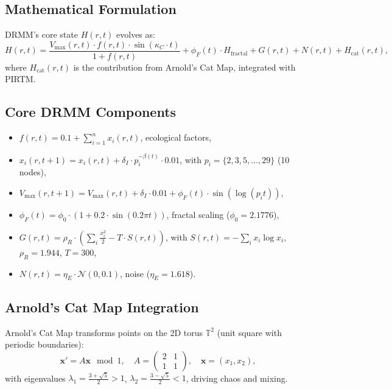 \documentclass{article}
\theoremstyle{plain}
\begin{document}
\subsection{Mathematical Formulation}
DRMM’s core state \( H(r,t) \) evolves as:
\begin{equation}
H(r,t) = \frac{V_{\text{max}}(r,t) \cdot f(r,t) \cdot \sin(\kappa_C \cdot t)}{1 + f(r,t)} + \phi_F(t) \cdot H_{\text{fractal}} + G(r,t) + N(r,t) + H_{\text{cat}}(r,t),
\end{equation}
where \( H_{\text{cat}}(r,t) \) is the contribution from Arnold’s Cat Map, integrated with PIRTM.

\subsection{Core DRMM Components}
\begin{itemize}
    \item \( f(r,t) = 0.1 + \sum_{i=1}^{n} x_i(r,t) \), ecological factors,
    \item \( x_i(r,t+1) = x_i(r,t) + \delta_I \cdot p_i^{-\beta(t)} \cdot 0.01 \), with \( p_i = \{2, 3, 5, \ldots, 29\} \) (10 nodes),
    \item \( V_{\text{max}}(r,t+1) = V_{\text{max}}(r,t) + \delta_I \cdot 0.01 + \phi_F(t) \cdot \sin(\log(p_i t)) \),
    \item \( \phi_F(t) = \phi_0 \cdot (1 + 0.2 \cdot \sin(0.2 \pi t)) \), fractal scaling (\( \phi_0 = 2.1776 \)),
    \item \( G(r,t) = \rho_R \cdot \left( \sum_i \frac{x_i^2}{2} - T \cdot S(r,t) \right) \), with \( S(r,t) = -\sum_i x_i \log x_i \), \( \rho_R = 1.944 \), \( T = 300 \),
    \item \( N(r,t) = \eta_E \cdot \mathcal{N}(0, 0.1) \), noise (\( \eta_E = 1.618 \)).
\end{itemize}

\subsection{Arnold’s Cat Map Integration}
Arnold’s Cat Map transforms points on the 2D torus \( \mathbb{T}^2 \) (unit square with periodic boundaries):
\begin{equation}
\mathbf{x}' = A \mathbf{x} \mod 1, \quad A = \begin{pmatrix} 2 & 1 \\ 1 & 1 \end{pmatrix}, \quad \mathbf{x} = (x_1, x_2),
\end{equation}
with eigenvalues \( \lambda_1 = \frac{3 + \sqrt{5}}{2} > 1 \), \( \lambda_2 = \frac{3 - \sqrt{5}}{2} < 1 \), driving chaos and mixing.
\end{document}
